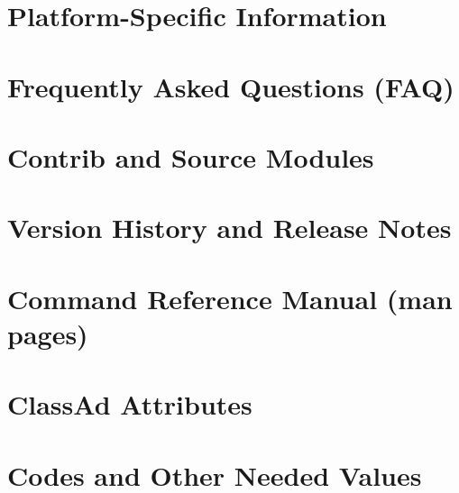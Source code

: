 \documentclass[titlepage,oneside,bookmarks,bookmarksnumbered,plainpages=false,pdfpagelabels]{book}
\renewcommand{\sectionmark}[1]{\markright{\thesection.\ #1}}
\renewcommand{\subsectionmark}[1]{\markright{\thesubsection.\ #1}}
\begin{document}
\chapter{Platform-Specific Information}
\label{platforms}


\chapter{Frequently Asked Questions (FAQ)}
\label{sec:FAQ}


\chapter{Contrib and Source Modules}
\label{sec:Contrib}


\chapter{Version History and Release Notes}
\label{Version-History}


\setcounter{original}{\value{secnumdepth}}
\setcounter{secnumdepth}{0}

\begingroup
\chapter{Command Reference Manual (man pages)}
\setlength{\parindent}{0em}
\renewcommand{\sectionmark}[1]{\markright{#1}}
\renewcommand{\subsectionmark}[1]{\markright{#1}}
\label{sec:command-reference}

\endgroup

\setcounter{secnumdepth}{\theoriginal}

\appendix

\chapter{ClassAd Attributes}
\label{sec:ClassAd-Attributes}


\chapter{Codes and Other Needed Values}
\label{sec:Magic-Numbers}


\backmatter

\ifpdf
\fi

\printindex
\end{document}
